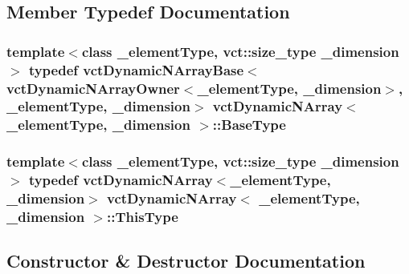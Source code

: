 \subsection{Member Typedef Documentation}
\hypertarget{classvct_dynamic_n_array_adc62cbbc97a16fa388dd96d4404fd075}{}
\subsubsection[{Base\+Type}]{\setlength{\rightskip}{0pt plus 5cm}template$<$class \+\_\+element\+Type, vct\+::size\+\_\+type \+\_\+dimension$>$ typedef {\bf vct\+Dynamic\+N\+Array\+Base}$<${\bf vct\+Dynamic\+N\+Array\+Owner}$<$\+\_\+element\+Type, \+\_\+dimension$>$, \+\_\+element\+Type, \+\_\+dimension$>$ {\bf vct\+Dynamic\+N\+Array}$<$ \+\_\+element\+Type, \+\_\+dimension $>$\+::{\bf Base\+Type}}\label{classvct_dynamic_n_array_adc62cbbc97a16fa388dd96d4404fd075}
\hypertarget{classvct_dynamic_n_array_a159dfdd698115f12caf629f7539029f5}{}
\subsubsection[{This\+Type}]{\setlength{\rightskip}{0pt plus 5cm}template$<$class \+\_\+element\+Type, vct\+::size\+\_\+type \+\_\+dimension$>$ typedef {\bf vct\+Dynamic\+N\+Array}$<$\+\_\+element\+Type, \+\_\+dimension$>$ {\bf vct\+Dynamic\+N\+Array}$<$ \+\_\+element\+Type, \+\_\+dimension $>$\+::{\bf This\+Type}}\label{classvct_dynamic_n_array_a159dfdd698115f12caf629f7539029f5}


\subsection{Constructor \& Destructor Documentation}
\hypertarget{classvct_dynamic_n_array_a060ec7a5353aa03ec193408550e4db87}{}
